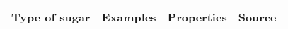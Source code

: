 \documentclass[../main.tex]{subfiles}
\begin{document}
\begin{table}[hb!]
  \centering
  \begin{tabularx}{\linewidth}{|p{3cm}|p{2.5cm}|p{3cm}|p{2.5cm}|}
    \toprule
    \textbf{Type of sugar} & \textbf{Examples} & \textbf{Properties} & \textbf{Source} \\
    \midrule
    
      
            

\end{tabularx}
\end{table}
\end{document}
